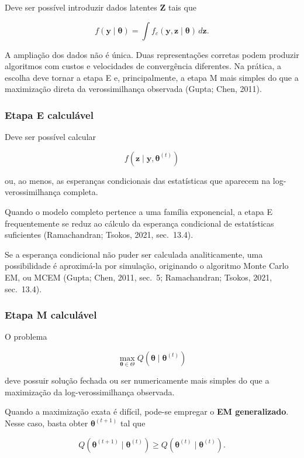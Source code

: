 \documentclass[
  letterpaper,
  DIV=11,
  numbers=noendperiod]{scrreprt}
\begin{document}
Deve ser possível introduzir dados latentes \(\boldsymbol{Z}\) tais que

\[f(\boldsymbol{y}\mid\boldsymbol{\theta})
=
\int
f_c(\boldsymbol{y},\boldsymbol{z}\mid\boldsymbol{\theta})
\,d\boldsymbol{z}.\]

A ampliação dos dados não é única. Duas representações corretas podem
produzir algoritmos com custos e velocidades de convergência diferentes.
Na prática, a escolha deve tornar a etapa E e, principalmente, a etapa M
mais simples do que a maximização direta da verossimilhança observada
(Gupta; Chen, 2011).

\subsubsection{Etapa E calculável}\label{etapa-e-calculuxe1vel}

Deve ser possível calcular

\[f(\boldsymbol{z}\mid\boldsymbol{y},\boldsymbol{\theta}^{(t)})\]

ou, ao menos, as esperanças condicionais das estatísticas que aparecem
na log-verossimilhança completa.

Quando o modelo completo pertence a uma família exponencial, a etapa E
frequentemente se reduz ao cálculo da esperança condicional de
estatísticas suficientes (Ramachandran; Tsokos, 2021, sec.~13.4).

Se a esperança condicional não puder ser calculada analiticamente, uma
possibilidade é aproximá-la por simulação, originando o algoritmo Monte
Carlo EM, ou MCEM (Gupta; Chen, 2011, sec.~5; Ramachandran; Tsokos,
2021, sec.~13.4).

\subsubsection{Etapa M calculável}\label{etapa-m-calculuxe1vel}

O problema

\[\max_{\boldsymbol{\theta}\in\Theta}
Q(\boldsymbol{\theta}\mid\boldsymbol{\theta}^{(t)})\]

deve possuir solução fechada ou ser numericamente mais simples do que a
maximização da log-verossimilhança observada.

Quando a maximização exata é difícil, pode-se empregar o \textbf{EM
generalizado}. Nesse caso, basta obter \(\boldsymbol{\theta}^{(t+1)}\)
tal que

\[Q(\boldsymbol{\theta}^{(t+1)}\mid\boldsymbol{\theta}^{(t)})
\geq
Q(\boldsymbol{\theta}^{(t)}\mid\boldsymbol{\theta}^{(t)}).\]
\end{document}
